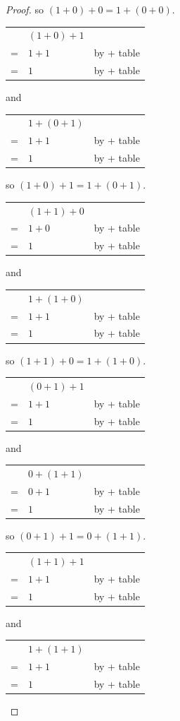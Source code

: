 \documentclass[14pt]{extarticle}
\newcommand{\cy}{\color{cyan}}
\begin{document}
\begin{proof}
so \((1 + 0) + 0 = 1 + (0 + 0)\).

\begin{tabular}{cll}
  & \((1 + 0) + 1\) & \\
= & \(1 + 1\) & {\cy by + table} \\
= & \(1\) & {\cy by + table}
\end{tabular}
and
\begin{tabular}{cll}
  & \(1 + (0 + 1)\) & \\
= & \(1 + 1\) & {\cy by + table} \\
= & \(1\) & {\cy by + table}
\end{tabular}

so \((1 + 0) + 1 = 1 + (0 + 1)\).

\begin{tabular}{cll}
  & \((1 + 1) + 0\) & \\
= & \(1 + 0\) & {\cy by + table} \\
= & \(1\) & {\cy by + table}
\end{tabular}
and
\begin{tabular}{cll}
  & \(1 + (1 + 0)\) & \\
= & \(1 + 1\) & {\cy by + table} \\
= & \(1\) & {\cy by + table}
\end{tabular}

so \((1 + 1) + 0 = 1 + (1 + 0)\).

\begin{tabular}{cll}
  & \((0 + 1) + 1\) & \\
= & \(1 + 1\) & {\cy by + table} \\
= & \(1\) & {\cy by + table}
\end{tabular}
and
\begin{tabular}{cll}
  & \(0 + (1 + 1)\) & \\
= & \(0 + 1\) & {\cy by + table} \\
= & \(1\) & {\cy by + table}
\end{tabular}

so \((0 + 1) + 1 = 0 + (1 + 1)\).

\begin{tabular}{cll}
  & \((1 + 1) + 1\) & \\
= & \(1 + 1\) & {\cy by + table} \\
= & \(1\) & {\cy by + table}
\end{tabular}
and
\begin{tabular}{cll}
  & \(1 + (1 + 1)\) & \\
= & \(1 + 1\) & {\cy by + table} \\
= & \(1\) & {\cy by + table}
\end{tabular}


\end{proof}
\end{document}
